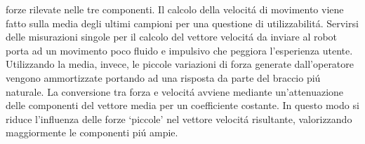 forze rilevate nelle tre componenti. Il calcolo della velocit\'{a} di movimento viene fatto sulla media degli ultimi campioni 
per una questione di utilizzabilit\'{a}. Servirsi delle misurazioni singole per il calcolo del vettore velocit\'{a} da inviare al robot 
porta ad un movimento poco fluido e impulsivo che peggiora l'esperienza utente. Utilizzando la media, invece, le piccole variazioni 
di forza generate dall'operatore vengono ammortizzate portando ad una risposta da parte del braccio pi\'{u} naturale.
La conversione tra forza e velocit\'{a} avviene mediante un'attenuazione delle componenti del vettore media per un coefficiente 
costante. In questo modo si riduce l'influenza delle forze `piccole' nel vettore velocit\'{a} risultante, valorizzando maggiormente le 
componenti pi\'{u} ampie. 
